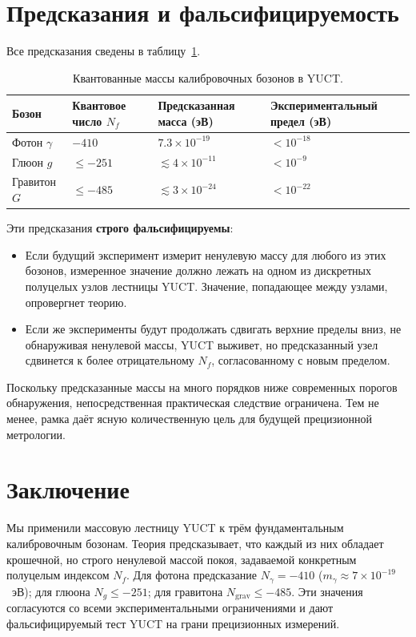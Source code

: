 \documentclass[11pt,a4paper]{article}
\begin{document}
	\clearpage
	\section{Предсказания и фальсифицируемость}
	
	Все предсказания сведены в таблицу~\ref{tab:predictions}.
	
	\begin{table}[H]
		\centering
		\footnotesize
		\caption{Квантованные массы калибровочных бозонов в YUCT.}
		\label{tab:predictions}
		\begin{tabular}{p{3cm}p{3cm}p{3cm}p{3cm}}
			\toprule
			\textbf{Бозон} & \textbf{Квантовое число $N_f$} & \textbf{Предсказанная масса (эВ)} & \textbf{Экспериментальный предел (эВ)} \\
			\midrule
			Фотон   $\gamma$ & $-410$ & $7.3 \times 10^{-19}$ & $< 10^{-18}$ \\
			Глюон    $g$      & $\le -251$ & $\lesssim 4 \times 10^{-11}$ & $< 10^{-9}$ \\
			Гравитон $G$      & $\le -485$ & $\lesssim 3 \times 10^{-24}$ & $< 10^{-22}$ \\
			\bottomrule
		\end{tabular}
	\end{table}
	
	Эти предсказания \textbf{строго фальсифицируемы}:
	\begin{itemize}
		\item Если будущий эксперимент измерит ненулевую массу для любого из этих бозонов, измеренное значение должно лежать
		на одном из дискретных полуцелых узлов лестницы YUCT. Значение, попадающее между узлами, опровергнет теорию.
		\item Если же эксперименты будут продолжать сдвигать верхние пределы вниз, не обнаруживая ненулевой массы, YUCT выживет,
		но предсказанный узел сдвинется к более отрицательному $N_f$, согласованному с новым пределом.
	\end{itemize}
	
	Поскольку предсказанные массы на много порядков ниже современных порогов обнаружения, непосредственная практическая
	следствие ограничена. Тем не менее, рамка даёт ясную количественную цель для будущей прецизионной метрологии.
	
	\section{Заключение}
	
	Мы применили массовую лестницу YUCT к трём фундаментальным калибровочным бозонам. Теория предсказывает,
	что каждый из них обладает крошечной, но строго ненулевой массой покоя, задаваемой конкретным полуцелым
	индексом $N_f$. Для фотона предсказание $N_\gamma = -410$ ($m_\gamma \approx 7\times 10^{-19}$~эВ);
	для глюона $N_g \le -251$; для гравитона $N_{\mathrm{grav}} \le -485$. Эти значения согласуются со всеми
	экспериментальными ограничениями и дают фальсифицируемый тест YUCT на грани прецизионных измерений.
	
\end{document}
